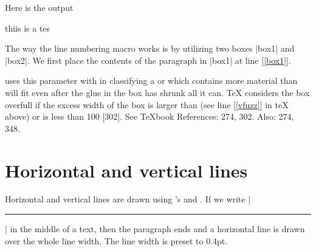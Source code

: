 \begin{teX}
\begin{teX}
\begin{teX}
\begin{teX}
\begin{teX}
\begin{teX}
\begin{teX}
\end{teX}

Here is the output

\lineskip=0pt
\parskip=0pt

\long{}



{
}



{\footnotesize \the\baselineskip}



thiis is a tes \par


\NumberParagraph{\lipsum[2]}

\bigskip

The way the line numbering macro works is by utilizing two boxes |box1| and |box2|. We first place the contents of the paragraph in |box1| at line [\ref{box1}]. 



\tex uses this parameter with  in classifying a  or  which contains more material than will fit even after the glue in the box has shrunk all it can. TeX considers the box overfull if the excess width of the box is larger than  (see line [\ref{vfuzz}] in  teX    above) or  is less than 100 [302].
See TeXbook References: 274, 302. Also: 274, 348.

\section{Horizontal and vertical lines}
\normalfont\normalsize

Horizontal and vertical lines are drawn using \tex's  and .
If we write |\hrule| in the  middle of a text, then the paragraph ends and
a horizontal line is drawn over the whole line width. The line width is preset to 0.4pt.


\end{teX}
\end{teX}
\end{teX}
\end{teX}
\end{teX}
\end{teX}
